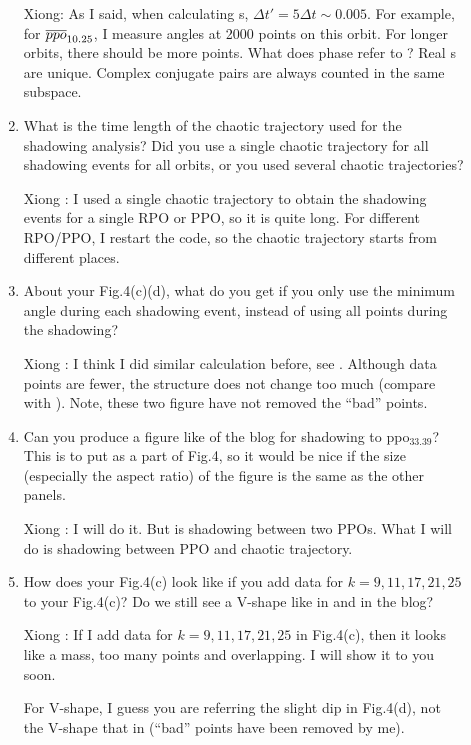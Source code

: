 \begin{description}
\begin{enumerate}
Xiong: As I said, when calculating \Fe s,
$\Delta t' = 5\Delta t \sim 0.005$. For example, for
${\overline{ppo}}_{10.25}$, I measure angles at 2000 points on this orbit.
For longer orbits, there should be more points.
What does phase refer to ? Real \Fv s are unique. Complex conjugate
pairs are always counted in the same subspace.

\item
What is the time length of the chaotic trajectory used for the shadowing analysis? Did you use a single chaotic trajectory for all shadowing events for all orbits, or you used several chaotic trajectories?

Xiong : I used a single chaotic trajectory to obtain the shadowing
events for a single RPO or PPO, so it is quite long.
For different RPO/PPO, I restart the
code, so the chaotic trajectory starts from different places.

\item
About your Fig.4(c)(d), what do you get if you only use the minimum angle during each shadowing event, instead of using all points during the shadowing?

Xiong : I think I did similar calculation before, see .
Although data points are fewer, the structure does not change too much
(compare   with  ). Note,
these two figure have not removed the ``bad'' points.

\item
Can you produce a figure like  of the blog for shadowing to ppo$_{33.39}$? This is to put as a part of Fig.4, so it would be nice if the size (especially the aspect ratio) of the figure is the same as the other panels.

Xiong : I will do it. But  is shadowing between two PPOs. What I will
do is shadowing between PPO and chaotic trajectory.

\item
How does your Fig.4(c) look like if you add data for $k=9,11,17,21,25$ to your Fig.4(c)? Do we
still see a V-shape like in 
and  in the blog?

Xiong : If I add data for $k=9,11,17,21,25$ in Fig.4(c), then it looks like a mass,
too many points and overlapping. I will show it to you soon.

For V-shape, I guess you are referring the
slight dip in Fig.4(d), not the V-shape that in 
(``bad'' points have been removed by me).


\end{enumerate}
\end{description}
